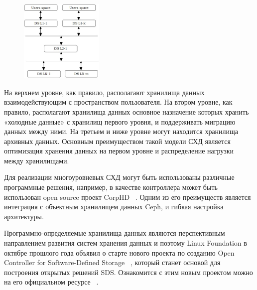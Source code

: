 \documentclass[10pt, a5paper]{article}
\begin{document}
\begin{center}

\begin{figure}[h!]
  \centering
  \includegraphics[width=4cm]{kliga2.jpg}
  
  \label{Kliga2}
\end{figure}

\end{center}


\begin{center}\end{center}

На верхнем уровне, как правило, располагают хранилища данных взаимодействующим с пространством пользователя. На втором уровне, как правило, располагают хранилища данных основное назначение которых хранить «холодные данные» с хранилищ первого уровня, и поддерживать миграцию данных между ними. На третьем и ниже уровне могут находится хранилища архивных данных. Основным преимуществом такой модели СХД является оптимизация хранения данных на первом уровне и распределение нагрузки между хранилищами.

Для реализации многоуровневых СХД могут быть использованы различные программные решения, например, в качестве контроллера может быть использован open source проект CorpHD ~\cite{kliga-8}. Одним из его преимуществ является интеграция с объектным хранилищем данных Ceph, и гибкая настройка архитектуры.

Программно-определяемые хранилища данных являются перспективным направлением развития систем хранения данных и поэтому  Linux Foundation в октябре прошлого года объявил о старте нового проекта по созданию Open Controller for Software-Defined Storage ~\cite{kliga-9}, который станет основой для построения открытых решений SDS. Ознакомится с этим новым проектом можно на его официальном ресурсе ~\cite{kliga-10}.
\end{document}
